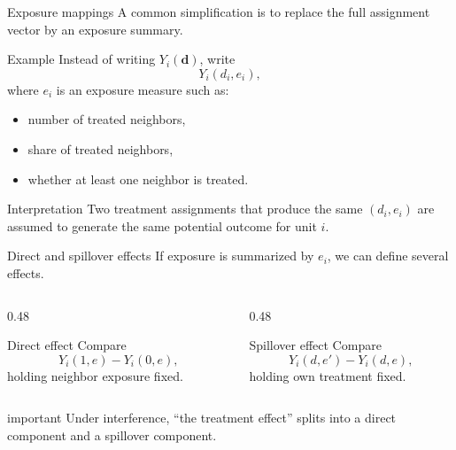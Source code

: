 \documentclass[dvipsnames,aspectratio=169,handout]{beamer}
\begin{document}
\begin{frame}{Exposure mappings}
A common simplification is to replace the full assignment vector by an exposure summary.

\begin{block}{Example}
Instead of writing $Y_i(\mathbf d)$, write
\[
Y_i(d_i, e_i),
\]
where $e_i$ is an exposure measure such as:
\begin{itemize}
    \item number of treated neighbors,
    \item share of treated neighbors,
    \item whether at least one neighbor is treated.
\end{itemize}
\end{block}

\begin{alertblock}{Interpretation}
Two treatment assignments that produce the same $(d_i,e_i)$ are assumed to generate the same potential outcome for unit $i$.
\end{alertblock}
\end{frame}

\begin{frame}{Direct and spillover effects}
If exposure is summarized by $e_i$, we can define several effects.

\begin{columns}[T]
\begin{column}{0.48\textwidth}
\begin{block}{Direct effect}
Compare
\[
Y_i(1,e)-Y_i(0,e),
\]
holding neighbor exposure fixed.
\end{block}
\end{column}
\begin{column}{0.48\textwidth}
\begin{block}{Spillover effect}
Compare
\[
Y_i(d,e')-Y_i(d,e),
\]
holding own treatment fixed.
\end{block}
\end{column}
\end{columns}

\begin{beamercolorbox}[wd=\textwidth,sep=8pt,center,rounded=true,shadow=true]{important}
Under interference, “the treatment effect” splits into a direct component and a spillover component.
\end{beamercolorbox}
\end{frame}
\end{document}
